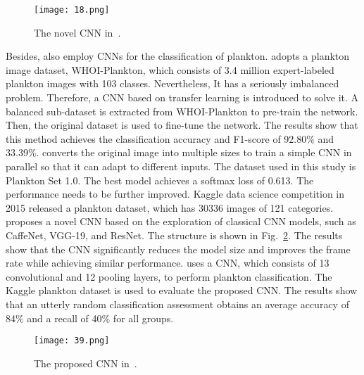 \begin{figure}[htbp!]
\centering
\texttt{[image: 18.png]}
\caption{The novel CNN in~\cite{Beaufort-2004-ARCD}.}
\label{fig18}
\end{figure}

Besides, \cite{Lee-2016-PCIL,Py-2016-PCDC,Yan-2017-AMEC,Luo-2018-APIA} also employ CNNs for the classification of plankton. \cite{Lee-2016-PCIL} adopts a plankton image dataset, WHOI-Plankton, which consists of 3.4 million expert-labeled plankton images with 103 classes. Nevertheless, It has a seriously imbalanced problem. Therefore, a CNN based on transfer learning is introduced to solve it. A balanced sub-dataset is extracted from WHOI-Plankton to pre-train the network. Then, the original dataset is used to fine-tune the network. The results show that this method achieves the classification accuracy and F1-score of 92.80\% and 33.39\%. \cite{Py-2016-PCDC} converts the original image into multiple sizes to train a simple CNN in parallel so that it can adapt to different inputs. The dataset used in this study is Plankton Set 1.0. The best model achieves a softmax loss of 0.613. The performance needs to be further improved. Kaggle data science competition in 2015 released a plankton dataset, which has 30336 images of 121 categories. \cite{Yan-2017-AMEC} proposes a novel CNN based on the exploration of classical CNN models, such as CaffeNet, VGG-19, and ResNet. The structure is shown in Fig.~\ref{fig39}. The results show that the CNN significantly reduces the model size and improves the frame rate while achieving similar performance. \cite{Luo-2018-APIA} uses a CNN, which consists of 13 convolutional and 12 pooling layers, to perform plankton classification. The Kaggle plankton dataset is used to evaluate the proposed CNN. The results show that an utterly random classification assessment obtains an average accuracy of 84\% and a recall of 40\% for all groups.

\begin{figure}[htbp!]
\centering
\texttt{[image: 39.png]}
\caption{The proposed CNN in~\cite{Yan-2017-AMEC}.}
\label{fig39}
\end{figure}



